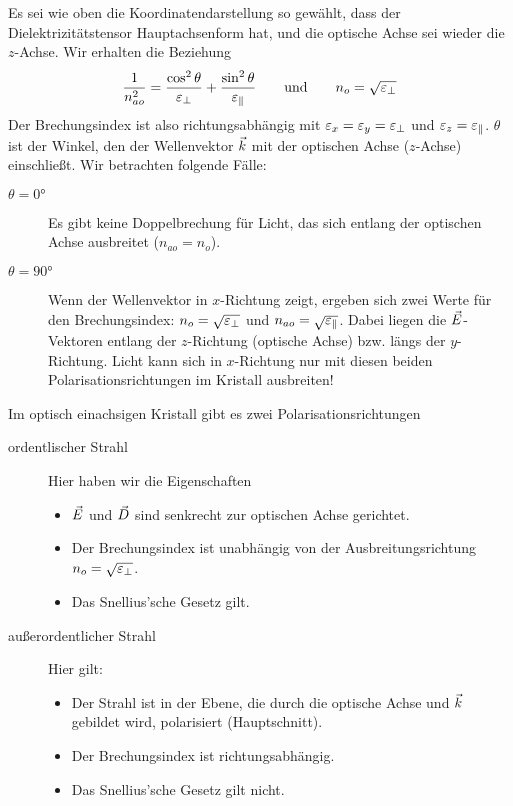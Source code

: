 Es sei wie oben die Koordinatendarstellung so gewählt, dass der
Dielektrizitätstensor Hauptachsenform hat, und die optische Achse sei
wieder die $z$-Achse. Wir erhalten die Beziehung
\begin{gather*}
  \frac{1}{n_{ao}^2} 
  = \frac{\cos^2\theta}{\varepsilon_\bot} + \frac{\sin^2\theta}{\varepsilon_\parallel}
  \qquad\text{und} \qquad
  n_o = \sqrt{\varepsilon_\bot}
\end{gather*}
Der Brechungsindex ist also richtungsabhängig mit
$\varepsilon_x=\varepsilon_y=\varepsilon_\bot$ und $\varepsilon_z=\varepsilon_\parallel$.
$\theta$ ist der Winkel, den der Wellenvektor $\vec{k}$ mit der optischen
Achse ($z$-Achse) einschließt.
Wir betrachten folgende Fälle:
\begin{description}
\item[$\theta=\ang{0}$] Es gibt keine Doppelbrechung für Licht, das
  sich entlang der optischen Achse ausbreitet ($n_{ao} = n_o$).
\item[$\theta=\ang{90}$] Wenn der Wellenvektor in $x$-Richtung zeigt,
  ergeben sich zwei Werte für den Brechungsindex: 
  $n_o=\sqrt{\varepsilon_\bot}$ und $n_{ao}=\sqrt{\varepsilon_\parallel}$.
  Dabei liegen die $\vec{E}$-Vektoren entlang der $z$-Richtung (optische
  Achse) bzw. längs der $y$-Richtung. Licht kann sich in $x$-Richtung
  nur mit diesen beiden Polarisationsrichtungen im Kristall ausbreiten!
\end{description}
Im optisch einachsigen Kristall gibt es zwei Polarisationsrichtungen
\begin{description}
\item[ordentlischer Strahl] Hier haben wir die Eigenschaften
  \begin{itemize}
  \item $\vec{E}$ und $\vec{D}$ sind senkrecht zur optischen Achse
    gerichtet.
  \item Der Brechungsindex ist unabhängig von der Ausbreitungsrichtung
    $n_o=\sqrt{\varepsilon_\bot}$.
  \item Das Snellius'sche Gesetz gilt.
  \end{itemize}
\item[außerordentlicher Strahl] Hier gilt:
  \begin{itemize}
  \item Der Strahl ist in der Ebene, die durch die optische Achse und
    $\vec{k}$ gebildet wird, polarisiert
    (Hauptschnitt).
    \item Der Brechungsindex ist richtungsabhängig.
    \item Das Snellius'sche Gesetz gilt nicht.
  \end{itemize}
\end{description}

